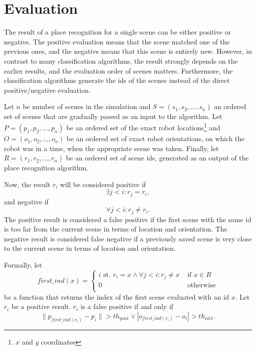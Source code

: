 \section{Evaluation}\label{section:Evaluation}

The result of a place recognition for a single scene can be either positive or negative. The positive evaluation means that the scene matched one of the previous ones, and the negative means that this scene is entirely new. However, in contrast to many classification algorithms, the result strongly depends on the earlier results, and the evaluation order of scenes matters. Furthermore, the classification algorithms generate the ids of the scenes instead of the direct positive/negative evaluation.\par
Let $n$ be number of scenes in the simulation and $S = \left(s_1, s_2, \dots, s_n\right)$ an ordered set of scenes that are gradually passed as an input to the algorithm. Let $P = \left(p_1, p_2, \dots, p_n\right)$ be an ordered set of the exact robot locations\footnote{$x$ and $y$ coordinates} and $O = \left(o_1, o_2, \dots, o_n\right)$ be an ordered set of exact robot orientations, on which the robot was in a time, when the appropriate scene was taken. Finally, let $R = \left(r_1, r_2, \dots, r_n \right)$ be an ordered set of scene ids, generated as an output of the place recognition algorithm.\par
Now, the result $r_i$ will be considered positive if
$$
    \exists j < i : r_j = r_i,
$$ and negative if
$$
    \forall j < i : r_j \neq r_i.
$$ The positive result is considered a false positive if the first scene with the same id is too far from the current scene in terms of location and orientation. The negative result is considered false negative if a previously saved scene is very close to the current scene in terms of location and orientation.\par
Formally, let
$$
    first\_ind(x) = \begin{cases}
        i\text{ st. } r_i = x \land \forall j < i: r_j \neq x & \text{ if $x \in R$} \\
        0                                                     & \text{ otherwise}    \\
    \end{cases}
$$
be a function that returns the index of the first scene evaluated with an id $x$. Let $r_i$ be a positive result. $r_i$ is a false positive if and only if
$$
    \| p_{first\_ind(r_i)} - p_i \| > th_\text{pos1} \lor | o_{first\_ind(r_i)} - o_i | > th_{\text{ori1}}.
$$\par
